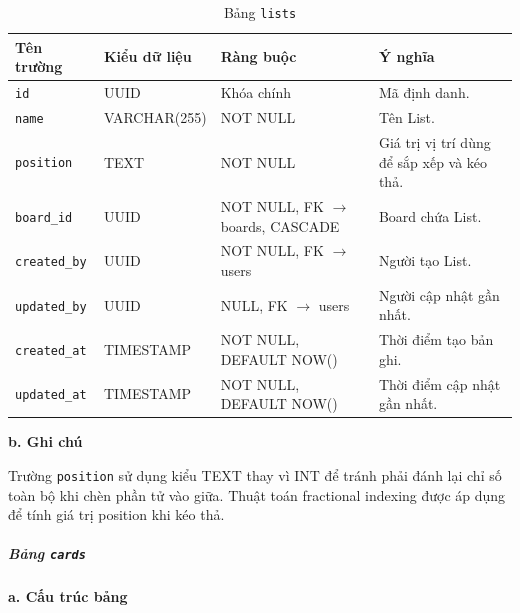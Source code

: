 \begin{table}[H]
\centering
\begin{tabular}{|p{3cm}|p{3.5cm}|p{3.5cm}|p{4cm}|}
\hline
\textbf{Tên trường} & \textbf{Kiểu dữ liệu} & \textbf{Ràng buộc} & \textbf{Ý nghĩa} \\
\hline
\texttt{id} & UUID & Khóa chính & Mã định danh. \\
\hline
\texttt{name} & VARCHAR(255) & NOT NULL & Tên List. \\
\hline
\texttt{position} & TEXT & NOT NULL & Giá trị vị trí dùng để sắp xếp và kéo thả. \\
\hline
\texttt{board\_id} & UUID & NOT NULL, FK $\rightarrow$ boards, CASCADE & Board chứa List. \\
\hline
\texttt{created\_by} & UUID & NOT NULL, FK $\rightarrow$ users & Người tạo List. \\
\hline
\texttt{updated\_by} & UUID & NULL, FK $\rightarrow$ users & Người cập nhật gần nhất. \\
\hline
\texttt{created\_at} & TIMESTAMP & NOT NULL, DEFAULT NOW() & Thời điểm tạo bản ghi. \\
\hline
\texttt{updated\_at} & TIMESTAMP & NOT NULL, DEFAULT NOW() & Thời điểm cập nhật gần nhất. \\
\hline
\end{tabular}
\caption{Bảng \texttt{lists}}
\label{tab:db_lists}
\end{table}

\hspace{1.5em}\textbf{b. Ghi chú}

Trường \texttt{position} sử dụng kiểu TEXT thay vì INT để tránh phải đánh lại chỉ số toàn bộ khi chèn phần tử vào giữa. Thuật toán fractional indexing được áp dụng để tính giá trị position khi kéo thả.


\subparagraph{Bảng \texttt{cards}} \mbox{}

\hspace{1.5em}\textbf{a. Cấu trúc bảng}

